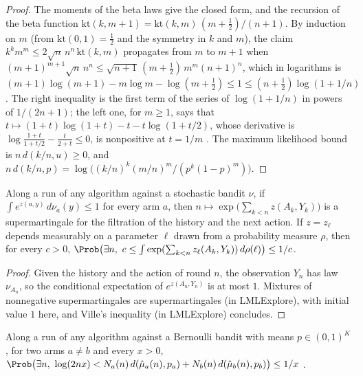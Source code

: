 \begin{proof}
  \leanok
  The moments of the beta laws give the closed form, and the recursion of the beta function
  $\mathrm{kt}(k, m + 1) = \mathrm{kt}(k, m)\,(m + \tfrac12)/(n + 1)$. By induction on $m$
  (from $\mathrm{kt}(0, 1) = \tfrac12$ and the symmetry in $k$ and $m$), the claim
  $k^k m^m \le 2\sqrt n\, n^n\, \mathrm{kt}(k, m)$ propagates from $m$ to $m + 1$ when
  $(m+1)^{m+1}\sqrt n\, n^n \le \sqrt{n+1}\,(m + \tfrac12)\, m^m (n+1)^n$, which in logarithms is
  $(m+1)\log(m+1) - m\log m - \log(m + \tfrac12) \le 1 \le (n + \tfrac12)\log(1 + 1/n)$. The
  right inequality is the first term of the series of $\log(1 + 1/n)$ in powers of $1/(2n+1)$;
  the left one, for $m \ge 1$, says that $t \mapsto (1+t)\log(1+t) - t - t\log(1 + t/2)$, whose
  derivative is $\log\frac{1+t}{1+t/2} - \frac{t}{2+t} \le 0$, is nonpositive at $t = 1/m$
  \cite[Appendix]{WST95}. The maximum likelihood bound is $n\, d(k/n, u) \ge 0$, and
  $n\, d(k/n, p) = \log\bigl((k/n)^k (m/n)^m / (p^k (1-p)^m)\bigr)$.
\end{proof}

\begin{lemma}
  \label{prereq:lr_supermartingale}
  \leanok
  Along a run of any algorithm against a stochastic bandit $\nu$, if
  $\int e^{z(a, y)}\, d\nu_a(y) \le 1$ for every arm $a$, then
  $n \mapsto \exp\bigl(\sum_{k < n} z(A_k, Y_k)\bigr)$ is a supermartingale for the filtration of
  the history and the next action. If $z = z_\ell$ depends measurably on a parameter $\ell$ drawn
  from a probability measure $\rho$, then for every $c > 0$,
  $\Prob\bigl(\exists n,\ c \le \int \exp(\sum_{k<n} z_\ell(A_k, Y_k))\, d\rho(\ell)\bigr) \le 1/c$.
\end{lemma}

\begin{proof}
  \leanok
  Given the history and the action of round $n$, the observation $Y_n$ has law $\nu_{A_n}$, so
  the conditional expectation of $e^{z(A_n, Y_n)}$ is at most $1$. Mixtures of nonnegative
  supermartingales are supermartingales (in LMLExplore), with initial value $1$ here, and Ville's
  inequality (in LMLExplore) concludes.
\end{proof}

\begin{lemma}
  \label{prereq:kt_pair}
  \leanok
  Along a run of any algorithm against a Bernoulli bandit with means $p \in (0, 1)^K$, for two arms
  $a \ne b$ and every $x > 0$,
  $\Prob\bigl(\exists n,\ \log(2nx) < N_a(n)\, d(\hat\mu_a(n), p_a) + N_b(n)\, d(\hat\mu_b(n),
  p_b)\bigr) \le 1/x$ \cite[proof of Theorem 10]{GK16}.
\end{lemma}

